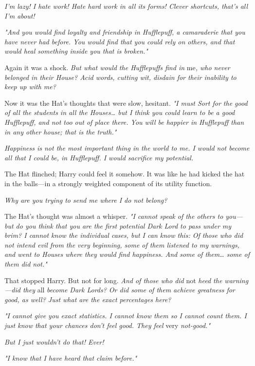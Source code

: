 \emph{I'm lazy! I hate work! Hate hard work in all its forms! Clever shortcuts, 
that's all I'm about!}

\emph{"And you would find loyalty and friendship in Hufflepuff, a camaraderie 
that you have never had before. You would find that you could rely on others, 
and that would heal something inside you that is broken."}

Again it was a shock. \emph{But what would the Hufflepuffs find in} me\emph{, 
who never belonged in their House? Acid words, cutting wit, disdain for their 
inability to keep up with me?}

Now it was the Hat's thoughts that were slow, hesitant. \emph{"I must Sort for 
the good of all the students in all the Houses{\ldots} but I think you could 
learn to be a good Hufflepuff, and not too out of place there. You will be 
happier in Hufflepuff than in any other house; that is the truth."}

\emph{Happiness is not the most important thing in the world to me. I would not 
become all that I could be, in Hufflepuff. I would sacrifice my potential.}

The Hat flinched; Harry could feel it somehow. It was like he had kicked the 
hat in the balls---in a strongly weighted component of its utility function.

\emph{Why are you trying to send me where I do not belong?}

The Hat's thought was almost a whisper. \emph{"I cannot speak of the others to 
you---but do you think that you are the first potential Dark Lord to pass under 
my brim? I cannot know the individual cases, but I can know this: Of those who 
did not intend evil from the very beginning, some of them listened to my 
warnings, and went to Houses where they would find happiness. And some of 
them{\ldots} some of them did not."}

That stopped Harry. But not for long. \emph{And of those who did} not\emph{ 
heed the warning---did they} all\emph{ become Dark Lords? Or did some of them 
achieve greatness for good, as well? Just what are the exact percentages here?}

\emph{"I cannot give you exact statistics. I cannot know them so I cannot count 
them. I just know that your chances don't feel good. They feel} very\emph{ 
not-good."}

\emph{But I just wouldn't do that! Ever!}

\emph{"I know that I have heard that claim before."}

